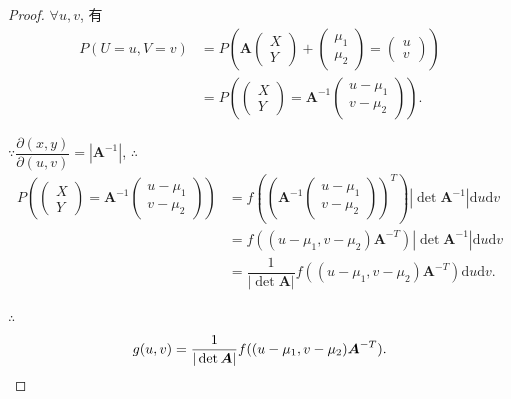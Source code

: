 \documentclass[color=black,device=normal,lang=cn]{elegantnote}
\numberwithin{equation}{section}
\theoremstyle{plain}
\numberwithin{exercise}{exsection}
\begin{document}
\begin{proof}
    $\forall u,v$, 有
    \begin{align*}
        P(U=u,V=v) & =P\left(\boldsymbol{A}\begin{pmatrix}
            X \\ Y
        \end{pmatrix}+\begin{pmatrix}
            \mu_1 \\ \mu_2
        \end{pmatrix}=\begin{pmatrix}
            u \\ v
        \end{pmatrix}\right) \\
        & =P\left(\begin{pmatrix}
            X \\ Y
        \end{pmatrix}=\boldsymbol{A}^{-1}\begin{pmatrix}
            u-\mu_1 \\ v-\mu_2
        \end{pmatrix}\right).
    \end{align*}

    $\because\dfrac{\partial(x,y)}{\partial(u,v)}=|\boldsymbol{A}^{-1}|$, $\therefore$ 
    \begin{align*}
        P\left(\begin{pmatrix}
            X \\ Y
        \end{pmatrix}=\boldsymbol{A}^{-1}\begin{pmatrix}
            u-\mu_1 \\ v-\mu_2
        \end{pmatrix}\right) & =f\left(\left(\boldsymbol{A}^{-1}\begin{pmatrix}
            u-\mu_1 \\ v-\mu_2
        \end{pmatrix}\right)^T\right)|\det\boldsymbol{A}^{-1}|\mathrm{d}u\mathrm{d}v \\
        & =f((u-\mu_1,v-\mu_2)\boldsymbol{A}^{-T})|\det\boldsymbol{A}^{-1}|\mathrm{d}u\mathrm{d}v \\
        & =\dfrac{1}{|\det\boldsymbol{A}|}f((u-\mu_1,v-\mu_2)\boldsymbol{A}^{-T})\mathrm{d}u\mathrm{d}v.
    \end{align*}

    $\therefore$
    \[g(u,v)=\dfrac{1}{|\det\boldsymbol{A}|}f((u-\mu_1,v-\mu_2)\boldsymbol{A}^{-T}).\qedhere\]
\end{proof}
\end{document}
